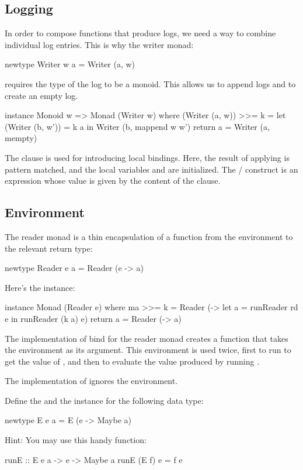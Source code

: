 \documentclass[DaoFP]{subfiles}
\begin{document}
\subsection{Logging}
In order to compose functions that produce logs, we need a way to combine individual log entries. This is why the writer monad:
\begin{haskell}
newtype Writer w a = Writer (a, w)
\end{haskell}
requires the type of the log to be a monoid. This allows us to append logs and to create an empty log.
\begin{haskell}
instance Monoid w => Monad (Writer w) where
  (Writer (a, w)) >>= k = let (Writer (b, w')) = k a
                          in Writer (b, mappend w w')
  return a = Writer (a, mempty)
\end{haskell}
The  clause is used for introducing local bindings. Here, the result of applying  is pattern matched, and the local variables  and  are initialized. The / construct is an expression whose value is given by the content of the  clause.

\subsection{Environment}

The reader monad is a thin encapsulation of a function from the environment to the relevant return type:
\begin{haskell}
newtype Reader e a = Reader (e -> a)
\end{haskell}
Here's the  instance:
\begin{haskell}
instance Monad (Reader e) where
  ma >>= k = Reader (\e -> let a = runReader rd e
                           in runReader (k a) e)
  return a = Reader (\e -> a)
\end{haskell}
The implementation of bind for the reader monad creates a function that takes the environment as its argument. This environment is used twice, first to run  to get the value of , and then to evaluate the value produced by running .

The implementation of  ignores the environment.

\begin{exercise}
Define the  and the  instance for the following data type:
\begin{haskell}
newtype E e a = E (e -> Maybe a)
\end{haskell}
Hint: You may use this handy function:
\begin{haskell}
runE :: E e a -> e -> Maybe a
runE (E f) e = f e
\end{haskell}
\end{exercise}
\end{document}
